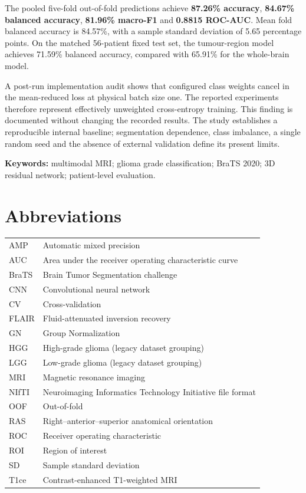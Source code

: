 \documentclass[12pt,a4paper,oneside]{report}
\begin{document}
The pooled five-fold out-of-fold predictions achieve \textbf{87.26\% accuracy}, \textbf{84.67\% balanced accuracy}, \textbf{81.96\% macro-F1} and \textbf{0.8815 ROC-AUC}. Mean fold balanced accuracy is 84.57\%, with a sample standard deviation of 5.65 percentage points. On the matched 56-patient fixed test set, the tumour-region model achieves 71.59\% balanced accuracy, compared with 65.91\% for the whole-brain model.

A post-run implementation audit shows that configured class weights cancel in the mean-reduced loss at physical batch size one. The reported experiments therefore represent effectively unweighted cross-entropy training. This finding is documented without changing the recorded results. The study establishes a reproducible internal baseline; segmentation dependence, class imbalance, a single random seed and the absence of external validation define its present limits.

\vspace{3mm}
\noindent\textbf{Keywords:} multimodal MRI; glioma grade classification; BraTS 2020; 3D residual network; patient-level evaluation.

\tableofcontents
\clearpage
\listoffigures
{}
\clearpage
\listoftables
{}
\clearpage
\chapter*{Abbreviations}
\begin{tabularx}{\linewidth}{lY}
\toprule
AMP & Automatic mixed precision\\
AUC & Area under the receiver operating characteristic curve\\
BraTS & Brain Tumor Segmentation challenge\\
CNN & Convolutional neural network\\
CV & Cross-validation\\
FLAIR & Fluid-attenuated inversion recovery\\
GN & Group Normalization\\
HGG & High-grade glioma (legacy dataset grouping)\\
LGG & Low-grade glioma (legacy dataset grouping)\\
MRI & Magnetic resonance imaging\\
NIfTI & Neuroimaging Informatics Technology Initiative file format\\
OOF & Out-of-fold\\
RAS & Right--anterior--superior anatomical orientation\\
ROC & Receiver operating characteristic\\
ROI & Region of interest\\
SD & Sample standard deviation\\
T1ce & Contrast-enhanced T1-weighted MRI\\
\bottomrule
\end{tabularx}
\end{document}
